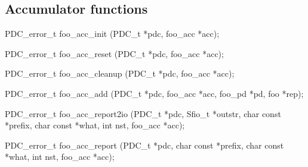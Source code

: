 \subsection{Accumulator functions}
\begin{code}
PDC_error_t foo_acc_init (PDC_t *pdc, foo_acc *acc);

PDC_error_t foo_acc_reset (PDC_t *pdc, foo_acc *acc);

PDC_error_t foo_acc_cleanup (PDC_t *pdc, foo_acc *acc);

PDC_error_t foo_acc_add (PDC_t *pdc, foo_acc *acc, foo_pd *pd, foo *rep);

PDC_error_t foo_acc_report2io (PDC_t *pdc, Sfio_t *outstr, 
                               char const *prefix, char const *what, 
                               int nst, foo_acc *acc);

PDC_error_t foo_acc_report (PDC_t *pdc, char const *prefix, 
                            char const *what, int nst, foo_acc *acc);

\end{code}
